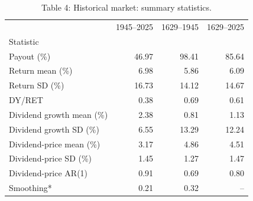 \begin{table}
\caption{Table 4: Historical market: summary statistics.}
\label{tab:replication_4}
\begin{tabular}{lrrr}
\toprule
 & 1945–2025 & 1629–1945 & 1629–2025 \\
Statistic &  &  &  \\
\midrule
Payout (\%) & 46.97 & 98.41 & 85.64 \\
Return mean (\%) & 6.98 & 5.86 & 6.09 \\
Return SD (\%) & 16.73 & 14.12 & 14.67 \\
DY/RET & 0.38 & 0.69 & 0.61 \\
Dividend growth mean (\%) & 2.38 & 0.81 & 1.13 \\
Dividend growth SD (\%) & 6.55 & 13.29 & 12.24 \\
Dividend-price mean (\%) & 3.17 & 4.86 & 4.51 \\
Dividend-price SD (\%) & 1.45 & 1.27 & 1.47 \\
Dividend-price AR(1) & 0.91 & 0.69 & 0.80 \\
Smoothing* & 0.21 & 0.32 & -- \\
\bottomrule
\end{tabular}
\end{table}
